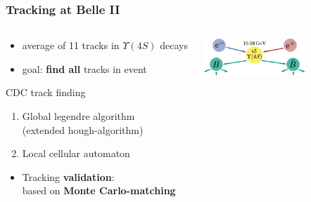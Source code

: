 \documentclass[18pt, aspectratio=169]{beamer}
\newcommand{\kitemph}[1]{\textcolor{kit-green100}{\bf{#1}}}
\begin{document}
\begin{frame}
  \frametitle{Tracking at Belle II}
  \begin{columns}
    \begin{column}{0.5\textwidth}

      \begin{itemize}
      \item average of 11 tracks in $\Upsilon(4S)$ decays
      \item goal: \kitemph{find all} tracks in event
      \end{itemize}
      \begin{block}{CDC track finding}
        \begin{enumerate}
        \item Global legendre algorithm\\(extended hough-algorithm)
        \item Local cellular automaton\\
        \end{enumerate}
      \end{block}
      \begin{itemize}
      \item Tracking \kitemph{validation}:\\
        based on \kitemph{Monte Carlo-matching}
      \end{itemize}
    \end{column}
    \begin{column}{0.5\textwidth}
      \centering \scriptsize
      \includegraphics[width=0.65\textwidth]{figures/eplus_eminus_to_b_bar_diagram.pdf}\\

\end{column}
\end{columns}
\end{frame}
\end{document}
